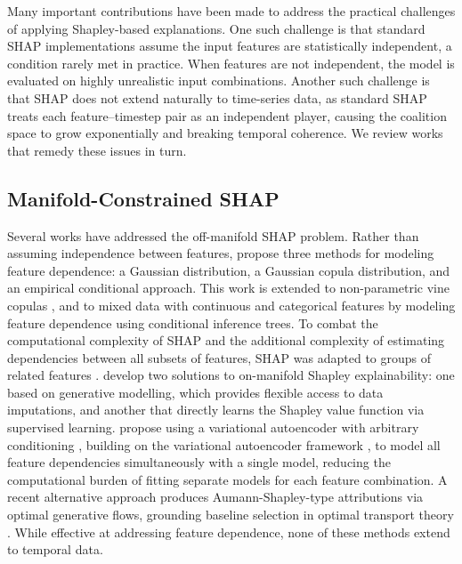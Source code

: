 Many important contributions have been made to address the practical challenges of applying Shapley-based explanations. One such challenge is that standard SHAP implementations assume the input features are statistically independent, a condition rarely met in practice. When features are not independent, the model is evaluated on highly unrealistic input combinations. Another such challenge is that SHAP does not extend naturally to time-series data, as standard SHAP treats each feature–timestep pair as an independent player, causing the coalition space to grow exponentially and breaking temporal coherence. We review works that remedy these issues in turn.
\subsection{Manifold-Constrained SHAP}
Several works have addressed the off-manifold SHAP problem. Rather than assuming independence between features, \cite{aas2021explaining} propose three methods for modeling feature dependence: a Gaussian distribution, a Gaussian copula distribution, and an empirical conditional approach. This work is extended to non-parametric vine copulas \citep{aas2021vineexplaining}, and to mixed data with continuous and categorical features \citep{redelmeier2020explaining} by modeling feature dependence using conditional inference trees. To combat the computational complexity of SHAP and the additional complexity of estimating dependencies between all subsets of features, SHAP was adapted to groups of related features \citep{jullum2021groupshapley}. \citet{frye2020shapley} develop two solutions to on-manifold Shapley explainability: one based on generative modelling, which provides flexible access to data imputations, and another that directly learns the Shapley value function via supervised learning. \citet{olsen2022using} propose using a variational autoencoder with arbitrary conditioning \citep{ivanov2018variational}, building on the variational autoencoder framework \citep{kingma2014auto}, to model all feature dependencies simultaneously with a single model, reducing the computational burden of fitting separate models for each feature combination. A recent alternative approach produces Aumann-Shapley-type attributions via optimal generative flows, grounding baseline selection in optimal transport theory \citep{zhang2026axiomatic}. While effective at addressing feature dependence, none of these methods extend to temporal data.
